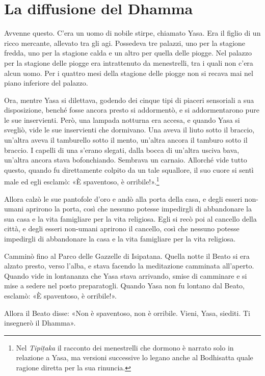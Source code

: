 \chapter{La diffusione del Dhamma}

 Avvenne questo. C’era un uomo di nobile stirpe, chiamato
Yasa. Era il figlio di un ricco mercante, allevato tra gli agi. Possedeva tre
palazzi, uno per la stagione fredda, uno per la stagione calda e un altro per
quella delle piogge. Nel palazzo per la stagione delle piogge era intrattenuto
da menestrelli, tra i quali non c’era alcun uomo. Per i quattro mesi della
stagione delle piogge non si recava mai nel piano inferiore del palazzo.

Ora, mentre Yasa si dilettava, godendo dei cinque tipi di piaceri sensoriali a
sua disposizione, benché fosse ancora presto si addormentò, e si addormentarono
pure le sue inservienti. Però, una lampada notturna era accesa, e quando Yasa si
svegliò, vide le sue inservienti che dormivano. Una aveva il liuto sotto il
braccio, un’altra aveva il tamburello sotto il mento, un’altra ancora il tamburo
sotto il braccio. I capelli di una s’erano slegati, dalla bocca di un’altra
usciva bava, un’altra ancora stava bofonchiando. Sembrava un carnaio. Allorché
vide tutto questo, quando fu direttamente colpito da un tale squallore, il suo
cuore si sentì male ed egli esclamò: «È spaventoso, è orribile!».\footnote{Nel
  \emph{Tipiṭaka} il racconto dei menestrelli che dormono è narrato solo in
  relazione a Yasa, ma versioni successive lo legano anche al Bodhisatta quale
  ragione diretta per la sua rinuncia.}

Allora calzò le sue pantofole d’oro e andò alla porta della casa, e degli esseri
non-umani aprirono la porta, così che nessuno potesse impedirgli di abbandonare
la sua casa e la vita famigliare per la vita religiosa. Egli si recò poi al
cancello della città, e degli esseri non-umani aprirono il cancello, così che
nessuno potesse impedirgli di abbandonare la casa e la vita famigliare per la
vita religiosa.

Camminò fino al Parco delle Gazzelle di Isipatana. Quella notte il Beato si era
alzato presto, verso l’alba, e stava facendo la meditazione camminata
all’aperto. Quando vide in lontananza che Yasa stava arrivando, smise di
camminare e si mise a sedere nel posto preparatogli. Quando Yasa non fu lontano
dal Beato, esclamò: «È spaventoso, è orribile!».

Allora il Beato disse: «Non è spaventoso, non è orribile. Vieni, Yasa, siediti.
Ti insegnerò il Dhamma».

